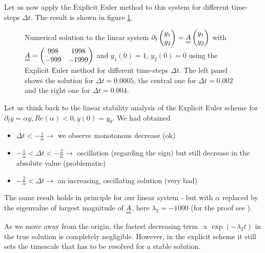 Let us now apply the Explicit Euler method to this system for different time-steps $\Delta t$. The result is shown in figure \ref{fig:simple_stiffness}.

\begin{figure}[!htb]
  \centering
  \hfill
  \caption{Numerical solution to the linear system $\partial_t \begin{pmatrix} y_1 \\ y_2 \end{pmatrix} = \mat{A} \begin{pmatrix} y_1 \\ y_2 \end{pmatrix}$ with $\mat{A} = \begin{pmatrix} 998 & 1998 \\ -999 & -1999 \end{pmatrix}$ and $y_1(0) = 1$, $y_2(0) = 0$ using the Explicit Euler method for different time-steps $\Delta t$. The left panel shows the solution for $\Delta t = 0.0005$, the central one for $\Delta t = 0.002$ and the right one for $\Delta t = 0.004$.}
  \label{fig:simple_stiffness}
\end{figure}

Let us think back to the linear stability analysis of the Explicit Euler scheme for $\partial_t y = \alpha y, Re(\alpha) < 0, y(0) = y_0$. We had obtained

\begin{itemize}
  \item $\Delta t < -\frac{1}{\alpha}  \rightarrow$ we observe monotonous decrease (ok)
  \item $-\frac{1}{\alpha} < \Delta t < -\frac{2}{\alpha} \rightarrow $ oscillation (regarding the sign) but still decrease in the absolute value (problematic)
  \item $-\frac{2}{\alpha} < \Delta t \rightarrow $ an increasing, oscillating solution (very bad)
\end{itemize}

The same result holds in principle for our linear system - but with $\alpha$ replaced by the eigenvalue of largest magnitude of $\mat{A}$, here $\lambda_2 = -1000$ (for the proof see \cite[chapter 17.5]{press07}).

As we move away from the origin, the fastest decreasing term $\propto \exp{\left( -\lambda_2 t\right)}$ in the true solution is completely negligible. However, in the explicit scheme it still sets the timescale that has to be resolved for a stable solution.

